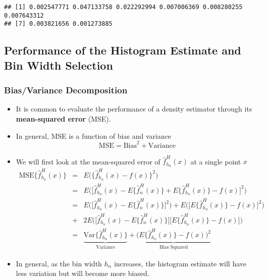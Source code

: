 \documentclass[]{book}
\begin{document}
\begin{verbatim}
## [1] 0.002547771 0.047133758 0.022292994 0.007006369 0.008280255 0.007643312
## [7] 0.003821656 0.001273885
\end{verbatim}

\hypertarget{performance-of-the-histogram-estimate-and-bin-width-selection}{%
\subsection{Performance of the Histogram Estimate and Bin Width Selection}\label{performance-of-the-histogram-estimate-and-bin-width-selection}}

\hypertarget{biasvariance-decomposition}{%
\subsubsection{Bias/Variance Decomposition}\label{biasvariance-decomposition}}

\begin{itemize}
\item
  It is common to evaluate the performance of a density estimator
  through its \textbf{mean-squared error} (MSE).
\item
  In general, MSE is a function of bias and variance
  \begin{equation}
  \textrm{MSE} = \textrm{Bias}^2 + \textrm{Variance}  \nonumber 
  \end{equation}
\item
  We will first look at the mean-squared error of \(\hat{f}_{h_{n}}^{H}( x )\) at a single point \(x\)
  \begin{eqnarray}
  \textrm{MSE}\{ \hat{f}_{h_{n}}^{H}(x) \} 
  &=& E\Big( \{ \hat{f}_{h_{n}}^{H}(x) - f(x) \}^{2}  \Big) \nonumber \\
  &=& E\Big( \Big[ \hat{f}_{h_{n}}^{H}(x) - E\{ \hat{f}_{n}^{H}(x) \} + E\{ \hat{f}_{h_{n}}^{H}(x) \} - f(x) \Big]^{2}  \Big) \nonumber \\
  &=& E\Big( \Big[ \hat{f}_{h_{n}}^{H}(x) - E\{ \hat{f}_{n}^{H}(x) \} \Big]^{2}  \Big) + E\Big( \Big[ E\{ \hat{f}_{h_{n}}^{H}(x) \} - f(x) \Big]^{2}  \Big) \nonumber \\
  &+& 2E\Big( \Big[ \hat{f}_{h_{n}}^{H}(x) - E\{ \hat{f}_{n}^{H}(x) \}\Big]\Big[ E\{ \hat{f}_{h_{n}}^{H}(x) \} - f(x) \Big]  \Big)  \nonumber \\ 
  &=& \underbrace{\textrm{Var}\{ \hat{f}_{h_{n}}^{H}(x) \}}_{\textrm{Variance}} + \underbrace{\Big( E\{ \hat{f}_{h_{n}}^{H}(x) \} - f(x)  \Big)^{2} }_{\textrm{Bias Squared}}  \nonumber
  \end{eqnarray}
\item
  In general, as the bin width \(h_{n}\) increases, the histogram estimate
  will have less variation but will become more biased.
\end{itemize}
\end{document}
